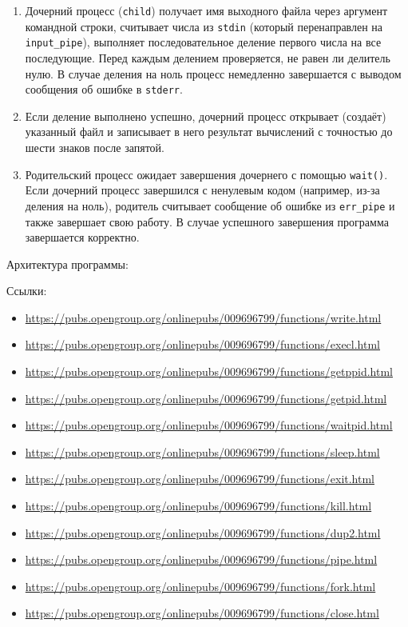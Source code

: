 \begin{enumerate}
\item Дочерний процесс (\texttt{child}) получает имя выходного файла через аргумент командной строки, считывает числа из \texttt{stdin} (который перенаправлен на \texttt{input\_pipe}), выполняет последовательное деление первого числа на все последующие. Перед каждым делением проверяется, не равен ли делитель нулю. В случае деления на ноль процесс немедленно завершается с выводом сообщения об ошибке в \texttt{stderr}.

\item Если деление выполнено успешно, дочерний процесс открывает (создаёт) указанный файл и записывает в него результат вычислений с точностью до шести знаков после запятой.

\item Родительский процесс ожидает завершения дочернего с помощью \texttt{wait()}. Если дочерний процесс завершился с ненулевым кодом (например, из-за деления на ноль), родитель считывает сообщение об ошибке из \texttt{err\_pipe} и также завершает свою работу. В случае успешного завершения программа завершается корректно.
\end{enumerate}

\vspace{10\baselineskip}

Архитектура программы:


Ссылки:

\begin{itemize}
\item \url{https://pubs.opengroup.org/onlinepubs/009696799/functions/write.html}
\item \url{https://pubs.opengroup.org/onlinepubs/009696799/functions/execl.html}
\item \url{https://pubs.opengroup.org/onlinepubs/009696799/functions/getppid.html}
\item \url{https://pubs.opengroup.org/onlinepubs/009696799/functions/getpid.html}
\item \url{https://pubs.opengroup.org/onlinepubs/009696799/functions/waitpid.html}
\item \url{https://pubs.opengroup.org/onlinepubs/009696799/functions/sleep.html}
\item \url{https://pubs.opengroup.org/onlinepubs/009696799/functions/exit.html}
\item \url{https://pubs.opengroup.org/onlinepubs/009696799/functions/kill.html}
\item \url{https://pubs.opengroup.org/onlinepubs/009696799/functions/dup2.html}
\item \url{https://pubs.opengroup.org/onlinepubs/009696799/functions/pipe.html}
\item \url{https://pubs.opengroup.org/onlinepubs/009696799/functions/fork.html}
\item \url{https://pubs.opengroup.org/onlinepubs/009696799/functions/close.html}
\end{itemize}

